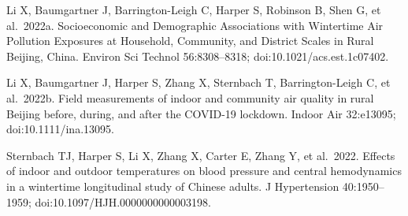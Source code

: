 \documentclass[
  letterpaper,
  DIV=11,
  numbers=noendperiod]{scrartcl}
\begin{document}
Li X, Baumgartner J, Barrington-Leigh C, Harper S, Robinson B, Shen G,
et al.~2022a. Socioeconomic and Demographic Associations with Wintertime
Air Pollution Exposures at Household, Community, and District Scales in
Rural Beijing, China. Environ Sci Technol 56:8308--8318;
doi:10.1021/acs.est.1c07402.

Li X, Baumgartner J, Harper S, Zhang X, Sternbach T, Barrington-Leigh C,
et al.~2022b. Field measurements of indoor and community air quality in
rural Beijing before, during, and after the COVID-19 lockdown. Indoor
Air 32:e13095; doi:10.1111/ina.13095.

Sternbach TJ, Harper S, Li X, Zhang X, Carter E, Zhang Y, et al.~2022.
Effects of indoor and outdoor temperatures on blood pressure and central
hemodynamics in a wintertime longitudinal study of Chinese adults. J
Hypertension 40:1950--1959; doi:10.1097/HJH.0000000000003198.
\end{document}
